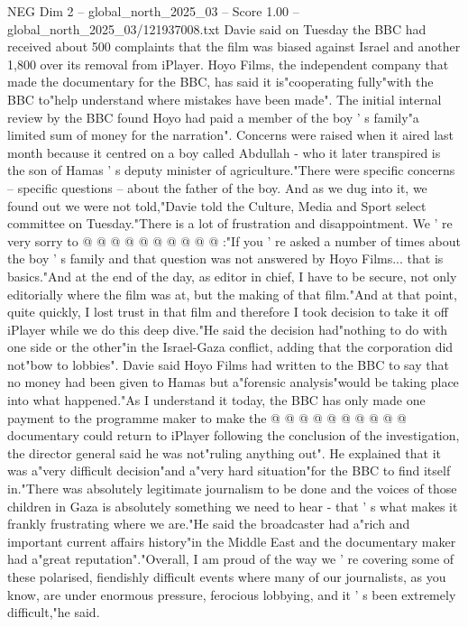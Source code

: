 \begin{textsample}{NEG Dim 2 – global\_north\_2025\_03 – Score 1.00 – global\_north\_2025\_03/121937008.txt}  \label{ex:f2_neg_047}
Davie said on Tuesday the BBC had received about 500 complaints that the film was biased against Israel and another 1,800 over its removal from iPlayer.
Hoyo Films, the independent company that made the documentary for the BBC, has said it is"cooperating fully"with the BBC to"help understand where mistakes have been made".
The initial internal review by the BBC found Hoyo had paid a member of the boy ' s family"a limited sum of money for the narration".
Concerns were raised when it aired last month because it centred on a boy called Abdullah - who it later transpired is the son of Hamas ' s deputy minister of agriculture."There were specific concerns -- specific questions -- about the father of the boy.
And as we dug into it, we found out we were not told,"Davie told the Culture, Media and Sport select committee on Tuesday."There is a lot of frustration and disappointment.
We ' re very sorry to @ @ @ @ @ @ @ @ @ @ :"If you ' re asked a number of times about the boy ' s family and that question was not answered by Hoyo Films... that is basics."And at the end of the day, as editor in chief, I have to be secure, not only editorially where the film was at, but the making of that film."And at that point, quite quickly, I lost trust in that film and therefore I took decision to take it off iPlayer while we do this deep dive."He said the decision had"nothing to do with one side or the other"in the Israel-Gaza conflict, adding that the corporation did not"bow to lobbies".
Davie said Hoyo Films had written to the BBC to say that no money had been given to Hamas but a"forensic analysis"would be taking place into what happened."As I understand it today, the BBC has only made one payment to the programme maker to make the @ @ @ @ @ @ @ @ @ @ documentary could return to iPlayer following the conclusion of the investigation, the director general said he was not"ruling anything out".
He explained that it was a"very difficult decision"and a"very hard situation"for the BBC to find itself in."There was absolutely legitimate journalism to be done and the voices of those children in Gaza is absolutely something we need to hear - that ' s what makes it frankly frustrating where we are."He said the broadcaster had a"rich and important current affairs history"in the Middle East and the documentary maker had a"great reputation"."Overall, I am proud of the way we ' re covering some of these polarised, fiendishly difficult events where many of our journalists, as you know, are under enormous pressure, ferocious lobbying, and it ' s been extremely difficult,"he said.

\end{textsample}
